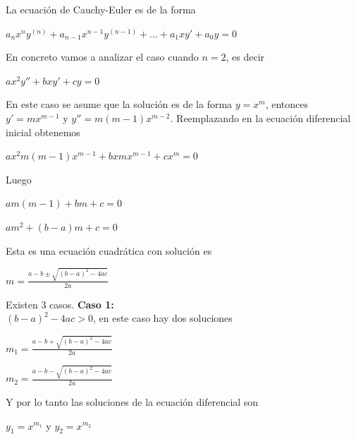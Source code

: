 \documentclass{article}
\theoremstyle{plain}
\theoremstyle{definition}
\begin{document}
La ecuación de Cauchy-Euler es de la forma


\begin{center}
$\displaystyle a_nx^ny^{(n)}+a_{n-1}x^{n-1}y^{(n-1)}+... +a_1xy'+a_0y = 0$
\end{center}

En concreto vamos a analizar el caso cuando $n=2$, es decir

\begin{center}
$\displaystyle ax^2y''+bxy'+cy =0$
\end{center}


En este caso se asume que la solución es de la forma $y=x^m$, entonces $y'=mx^{m-1}$ y $y''=m(m-1)x^{m-2}$. Reemplazando en la ecuación diferencial inicial obtenemos


\begin{center}
$\displaystyle ax^2m(m-1)x^{m-1}+bxmx^{m-1}+cx^m =0$
\end{center}

Luego


\begin{center}
$\displaystyle am(m-1)+bm+c =0$
\end{center}

\begin{center}
$\displaystyle am^2+(b-a)m+c =0$
\end{center}

Esta es una ecuación cuadrática con solución  es


\begin{center}
$\displaystyle m = \frac{a-b \pm \sqrt{(b-a)^2-4ac}}{2a}$
\end{center}

Existen 3 casos. \textbf{Caso 1: } \\


$(b-a)^2-4ac >0$, en este caso hay dos soluciones



\begin{center}
$\displaystyle m_1 = \frac{a-b + \sqrt{(b-a)^2-4ac}}{2a}$
\end{center}


\begin{center}
$\displaystyle m_2 = \frac{a-b - \sqrt{(b-a)^2-4ac}}{2a}$
\end{center}

Y por lo tanto las soluciones de la ecuación diferencial son


\begin{center}
$y_1=x^{m_1}$ y $y_2=x^{m_2}$
\end{center}
\end{document}
